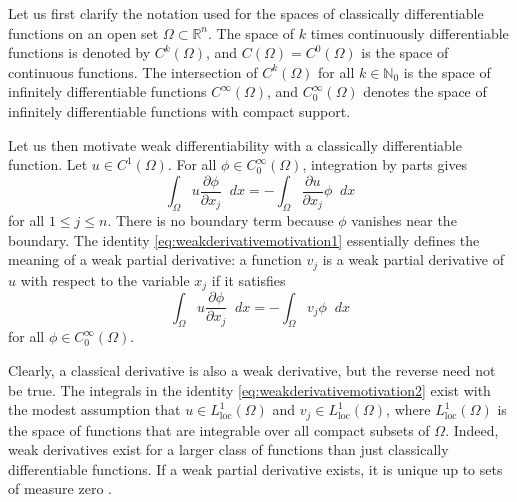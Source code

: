 \documentclass[english, 12pt, a4paper, sci, utf8, a-2b, online]{aaltothesis}
\theoremstyle{definition}
\theoremstyle{plain}
\newcommand*\diff{\mathop{}\!d}
\numberwithin{equation}{section}
\begin{document}
Let us first clarify the notation used for the spaces of classically
differentiable functions on an open set $\Omega \subset \mathbb{R}^n$.
The space of $k$ times continuously differentiable functions is denoted by
$C^k(\Omega)$, and $C(\Omega) = C^0(\Omega)$ is the space of continuous functions.
The intersection of $C^k(\Omega)$ for all $k \in \mathbb{N}_0$
is the space of infinitely differentiable functions $C^{\infty}(\Omega)$,
and $C_0^{\infty}(\Omega)$ denotes the space of infinitely differentiable
functions with compact support.

Let us then motivate weak differentiability with a classically
differentiable function. Let $u \in C^1(\Omega)$. For all
$\phi \in C_0^{\infty}(\Omega)$, integration by parts gives
\begin{equation}
    \label{eq:weakderivativemotivation1}
    \int_{\Omega} u \frac{\partial \phi}{\partial x_j} \diff x
    = - \int_{\Omega} \frac{\partial u}{\partial x_j} \phi \diff x
\end{equation}
for all $1 \leq j \leq n$. There is no boundary term because
$\phi$ vanishes near the boundary. The identity \eqref{eq:weakderivativemotivation1}
essentially defines the meaning of a weak partial derivative:
a function $v_j$ is a weak partial derivative of $u$ with respect to the variable
$x_j$ if it satisfies
\begin{equation}
    \label{eq:weakderivativemotivation2}
    \int_{\Omega} u \frac{\partial \phi}{\partial x_j} \diff x
    = - \int_{\Omega} v_j \phi \diff x
\end{equation}
for all $\phi \in C_0^{\infty}(\Omega)$.

Clearly, a classical derivative is also a weak derivative, but the reverse need not be true.
The integrals in the identity \eqref{eq:weakderivativemotivation2} exist
with the modest assumption that $u \in L_{\text{loc}}^1(\Omega)$
and $v_j \in L_{\text{loc}}^1(\Omega)$, where $L_{\text{loc}}^1(\Omega)$
is the space of functions that are integrable over all compact subsets of $\Omega$.
Indeed, weak derivatives exist
for a larger class of functions than just classically differentiable functions.
If a weak partial derivative exists, it is unique up to sets of measure zero \cite{adams2003}.
\end{document}
